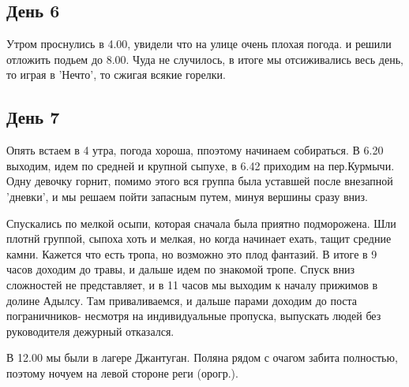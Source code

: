 \documentclass[]{article}
\begin{document}
\subsection{День 6}
Утром проснулись в 4.00, увидели что на улице очень плохая погода. и решили отложить подьем до 8.00. Чуда не случилось, в итоге мы отсиживались весь день, то играя в 'Нечто', то сжигая всякие горелки.

\subsection{День 7}
Опять встаем в 4 утра, погода хороша, ппоэтому начинаем собираться. В 6.20 выходим, идем по средней и крупной сыпухе,  в 6.42 приходим на пер.Курмычи. Одну девочку горнит, помимо этого вся группа была уставшей после внезапной 'дневки', и мы решаем пойти запасным путем, минуя вершины сразу вниз.

Спускались по мелкой осыпи, которая сначала была приятно подморожена. Шли плотнй группой, сыпоха хоть и мелкая, но когда начинает ехать, тащит средние камни. Кажется что есть тропа, но возможно это плод фантазий. В итоге в 9 часов доходим до травы, и дальше идем по знакомой тропе. Спуск вниз сложностей не представляет, и в 11 часов мы выходим к началу прижимов в долине Адылсу. Там приваливаемся, и дальше парами доходим до поста пограничников- несмотря на индивидуальные пропуска, выпускать людей без руководителя дежурный отказался.

В 12.00 мы были в лагере Джантуган. Поляна рядом с очагом забита полностью, поэтому ночуем на левой стороне реги (орогр.).
\end{document}
